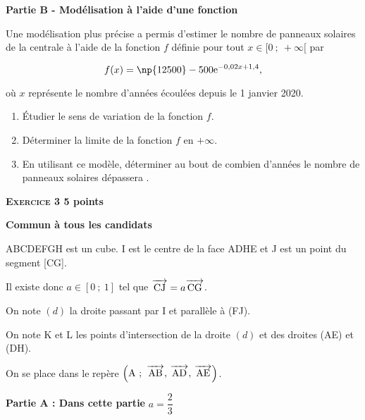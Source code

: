\documentclass[11pt,a4paper]{article}
\newcommand{\vect}[1]{\overrightarrow{\,\mathstrut#1\,}}
\newcommand{\e}{\text{e}}
\begin{document}
\bigskip

\textbf{Partie B - Modélisation à l'aide d'une fonction}

\medskip

Une modélisation plus précise a permis d'estimer le nombre de panneaux solaires de la centrale à l'aide de la fonction $f$ définie pour tout $x \in [0~;~ +\infty[$ par

\[f(x) = \np{12500} - 500 \e^{-0,02x+1,4},\]

 où $x$ représente le nombre d'années écoulées depuis le 1 janvier 2020.

\medskip

\begin{enumerate}
\item Étudier le sens de variation de la fonction $f$.
\item Déterminer la limite de la fonction $f$ en $+\infty$.
\item En utilisant ce modèle, déterminer au bout de combien d'années le nombre de panneaux
solaires dépassera .
\end{enumerate}

\bigskip

\textbf{\textsc{Exercice 3} \hfill 5 points}

\textbf{Commun à tous les candidats}

\medskip

ABCDEFGH est un cube. I est le centre de la face ADHE et J est un point du segment [CG].

Il existe donc $a \in [0~;~1]$ tel que $\vect{\text{CJ}} =a \vect{\text{CG}}$.

On note $(d)$ la droite passant par I et parallèle à (FJ).

On note K et L les points d'intersection de la droite $(d)$ et des droites (AE) et (DH).

On se place dans le repère $\left(\text{A}~;~\vect{\text{AB}},\,\vect{\text{AD}},\, \vect{\text{AE}}\right)$.

\bigskip

\textbf{Partie A : Dans cette partie} \boldmath $a = \dfrac{2}{3}$ \unboldmath
\end{document}
